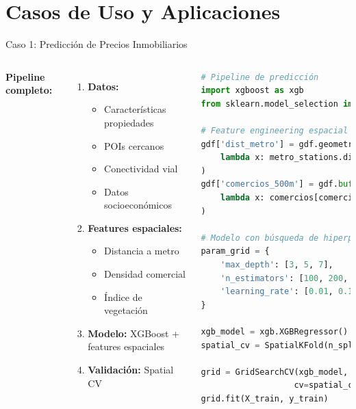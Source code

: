 \documentclass[10pt,aspectratio=169]{beamer}
\begin{document}
\section{Casos de Uso y Aplicaciones}

\begin{frame}{Caso 1: Predicción de Precios Inmobiliarios}
    \begin{columns}
        \textbf{Pipeline completo:}
        \begin{enumerate}
            \item \textbf{Datos:}
                \begin{itemize}
                    \item Características propiedades
                    \item POIs cercanos
                    \item Conectividad vial
                    \item Datos socioeconómicos
                \end{itemize}
            \item \textbf{Features espaciales:}
                \begin{itemize}
                    \item Distancia a metro
                    \item Densidad comercial
                    \item Índice de vegetación
                \end{itemize}
            \item \textbf{Modelo:} XGBoost + features espaciales
            \item \textbf{Validación:} Spatial CV
        \end{enumerate}

        \begin{lstlisting}[language=Python,basicstyle=\tiny]
# Pipeline de predicción
import xgboost as xgb
from sklearn.model_selection import GridSearchCV

# Feature engineering espacial
gdf['dist_metro'] = gdf.geometry.apply(
    lambda x: metro_stations.distance(x).min()
)
gdf['comercios_500m'] = gdf.buffer(500).apply(
    lambda x: comercios[comercios.within(x)].shape[0]
)

# Modelo con búsqueda de hiperparámetros
param_grid = {
    'max_depth': [3, 5, 7],
    'n_estimators': [100, 200, 300],
    'learning_rate': [0.01, 0.1, 0.3]
}

xgb_model = xgb.XGBRegressor()
spatial_cv = SpatialKFold(n_splits=5)

grid = GridSearchCV(xgb_model, param_grid,
                   cv=spatial_cv)
grid.fit(X_train, y_train)
        \end{lstlisting}
    \end{columns}
\end{frame}
\end{document}
